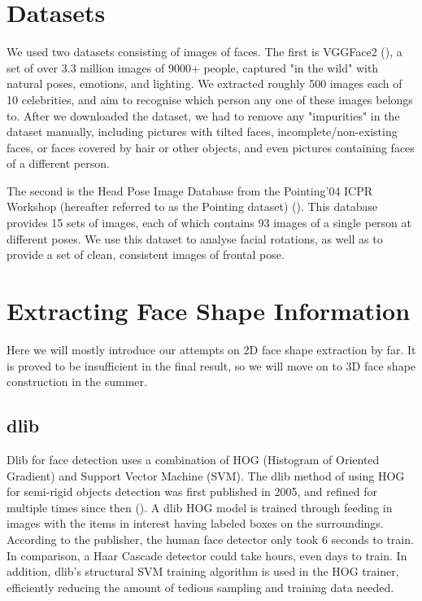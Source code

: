 \documentclass{article}
\begin{document}

\section{Datasets}

We used two datasets consisting of images of faces. The first is VGGFace2
(\cite{vggface2}), a set of over 3.3 million images of 9000+ people, captured
"in the wild" with natural poses, emotions, and lighting. We extracted roughly
500 images each of 10 celebrities, and aim to recognise which person any one of
these images belongs to. After we downloaded the dataset, we had to remove any
"impurities" in the dataset manually, including pictures with tilted faces,
incomplete/non-existing faces, or faces covered by hair or other objects, and
even pictures containing faces of a different person.

The second is the Head Pose Image Database from the Pointing'04 ICPR Workshop
(hereafter referred to as the Pointing dataset) (\cite{pointing}). This database
provides 15 sets of images, each of which contains 93 images of a single person
at different poses. We use this dataset to analyse facial rotations, as well as
to provide a set of clean, consistent images of frontal pose.


\section{Extracting Face Shape Information}

Here we will mostly introduce our attempts on 2D face shape extraction by far.
It is proved to be insufficient in the final result, so we will move on to 3D
face shape construction in the summer.

\subsection{dlib}

Dlib for face detection uses a combination of HOG (Histogram of Oriented
Gradient) and Support Vector Machine (SVM). The dlib method of using HOG for
semi-rigid objects detection was first published in 2005, and refined for
multiple times since then (\cite{Kazemi2014OneMF}). A dlib HOG model is trained
through feeding in images with the items in interest having labeled boxes on the
surroundings. According to the publisher, the human face detector only took 6
seconds to train. In comparison, a Haar Cascade detector could take hours, even
days to train. In addition, dlib's structural SVM training algorithm is used in
the HOG trainer, efficiently reducing the amount of tedious sampling and
training data needed.
\end{document}
